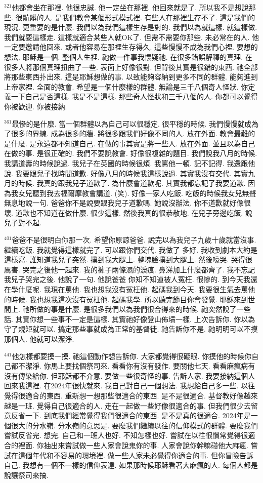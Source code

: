 \documentclass{book}
\begin{document}
$^{321}$他都會坐在那裡.
他很忠誠.
他一定坐在那裡.
他回來就是了.
所以我不是想說那些.
很骯髒的人.
是我們教會某個形式模式裡.
有些人在那裡生存不了.
這是我們的現況.
更重要的是什麼.
我們以為我們這樣生存是對的.
我們以為就這樣.
就這樣做.
我們就要這樣走.
這樣就適合某些人就OK了.
但需不需要你那些.
未必常在的人.
他一定要邀請他回來.
或者他容易在那裡生存得久.
這些慢慢不成為我們心裡.
要想的想法.
耶穌是一個.
整個人生裡.
祂做一件事我懷疑祂.
在很多錯誤解釋的真理.
在很多人將那個真理扭曲了一些.
表面上好像很對.
但背後其實是很錯的東西.
祂全部將那些東西扑出來.
這是耶穌想做的事.
以致能夠容納到更多不同的群體.
能夠進到上帝家裡.
全面的教會.
希望是一個什麼樣的群體.
無論是三千八個奇人怪狀.
你定義一下自己是否這樣.
我是不是這樣.
那些奇人怪狀和三千八個的人.
你都可以覺得你被歡迎.
你被接納.

$^{361}$最慘的是什麼.
當一個群體以為自己可以很穩定.
很平穩的時候.
我們慢慢就成為了很多的界線.
成為很多的牆.
將很多跟我們好像不同的人.
放在外面.
教會最難的是什麼.
是永遠都不知道自己.
在做的事其實是將一些人.
放在外面.
並且以為自己在做的事.
是很正確的.
我們不要說教會.
好像很複雜的題目.
我們說我八月的時候.
我講道壽的時候說過.
我兒子在英國的時候很煩.
我罵他一頓.
記不記得.
我還跟他說.
我要跟兒子找時間道歉.
好像八月的時候我這樣說過.
其實我沒有交代.
其實九月的時候.
我真的跟我兒子道歉了.
為什麼會道歉呢.
其實我都忘記了我要道歉.
因為我女兒聽到我去福爾摩教會講道.
(笑).
好像一家人吃飯.
吃飯的時候我女兒無聲無息地說一句.
爸爸你不是說要跟我兒子道歉嗎.
她說沒辦法.
你不道歉就好像很壞.
道歉也不知道在做什麼.
很少這樣.
然後我真的很恭敬地.
在兒子旁邊吃飯.
說兒子對不起.

$^{401}$爸爸不是很明白你那一次.
希望你原諒爸爸.
說完以為我兒子九歲十歲就當沒事.
繼續吃飯.
我就覺得這樣就完了.
可以跟你們交代.
我做了 多好.
我收到劇本大約是這樣寫.
誰知道我兒子突然.
撲到我大腿上.
整塊臉撲到大腿上.
然後嚎哭.
哭得很厲害.
哭完之後他一起來.
我的褲子兩條濕的淚痕.
鼻涕加上什麼都齊了.
我不忘記我兒子哭完之後.
他說了一句.
他說爸爸 你知不知道被人冤枉.
很慘的.
到今天我還在學什麼呢.
我現在罵他.
我也想我沒有冤枉他.
起碼我到今天.
我要很生氣去罵他的時候.
我也想我這次沒有冤枉他.
起碼我學.
所以聽完節目你會發覺.
耶穌來到世間上.
祂所做的事是什麼.
是很多我們以為我們很合得來的時候.
祂突然說了一些話.
其實你想一些事不一定是這樣.
其實祂好像登山佈墳一樣.
上次告訴你.
你以為守了規矩就可以.
搞定那些事就成為正常的基督徒.
祂告訴你不是.
祂明明可以不摸那個人.
他就可以潔淨.

$^{441}$他怎樣都要摸一摸.
祂這個動作想告訴你.
大家都覺得很礙眼.
你摸他的時候你自己都不潔淨.
你馬上要找個祭司來.
看看你有沒有發作.
要關他七天.
看看麻瘋病有沒有傳染給你.
但耶穌都不介意.
要做一些很奇怪的事.
告訴人家.
我要接納這個人回來我這裡.
在2024年很快就來.
我自己對自己一個想法.
我想給自己多一些.
以往覺得很適合的東西.
重新想一想那些很適合的東西.
是不是很適合.
基督教好像越來越是一班.
覺得自己很適合的人.
走在一起做一些好像很適合的事.
但我們很少去留意反省一下.
到底我們經常覺得我們很適合的東西.
是不是真的很適合.
2024年是一個很大的分水嶺.
分水嶺的意思是.
要麼我們繼續以往的信仰模式的群體.
要麼我們嘗試反省完.
想完.
自己和一班人也好.
不知怎樣也好.
嘗試在以往很慣常覺得很適合的裡面.
你抽出來嘗試做一些人家會說鬼你的事.
人家會說你幹嘛碰他大麻瘋.
嘗試在這個年代和不容易的環境裡.
做一些人家未必覺得你適合的事.
但你冒險告訴自己.
我想有一個不一樣的信仰表達.
如果那時候耶穌看著大麻瘋的人.
每個人都是說讓祭司來搞.
\end{document}
